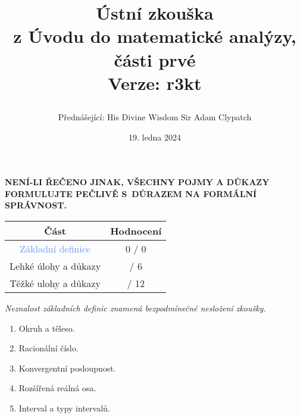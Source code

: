 \documentclass[a4paper,11pt]{article}
\title{\Huge\textsf{Ústní zkouška}\\
 \Large\textsf{z Úvodu do matematické analýzy, části prvé}\\
 \vspace*{1em}
 Verze: r3kt\\
 \author{Přednášející: His Divine Wisdom Sir Adam Clypatch}
 \date{19. ledna 2024}
}
\begin{document}
 \maketitle
 \begin{tcolorbox}[boxsep=3mm,arc=0mm,toprule=1pt,bottomrule=1pt,leftrule=-0.1mm,
   rightrule=-0.1mm,colframe=red!90!black]
  \vspace*{-2pt}
  \begin{center}
   \textbf{NENÍ-LI ŘEČENO JINAK, VŠECHNY POJMY A DŮKAZY FORMULUJTE PEČLIVĚ
   S~DŮRAZEM NA FORMÁLNÍ SPRÁVNOST.}
  \end{center}
 \end{tcolorbox}
 \vspace*{\fill}
 \begin{center}
  \begin{tabular}{c|c}
   \textsf{\textbf{Část}} & \textsf{\textbf{Hodnocení}}\\
   \toprule
   \textcolor{CornflowerBlue}{Základní definice} & 0 / 0\\
   \textcolor{Emerald}{Lehké úlohy a důkazy} & \hspace{2ex}/ 6\\
   \textcolor{BrickRed}{Těžké ulohy a důkazy} & \hspace{2ex} / 12
  \end{tabular}
 \end{center}
 \vspace*{\fill}
 \clearpage
 \begin{tcolorbox}[title=\textsf{Základní
   definice (0 bodů)},arc=0mm,boxsep=3mm,bottomrule=1pt,toprule=3pt,leftrule=-0.1mm,
   rightrule=-0.1mm,colframe=CornflowerBlue!80!white,
   colback=CornflowerBlue!5!white]
  \emph{Neznalost základních definic znamená bezpodmínečné nesložení
  zkoušky.}
  \begin{enumerate}
   \item Okruh a těleso.
   \item Racionální číslo.
   \item Konvergentní posloupnost.
   \item Rozšířená reálná osa.
   \item Interval a typy intervalů.
  \end{enumerate}
 \end{tcolorbox}
 \clearpage
\end{document}
